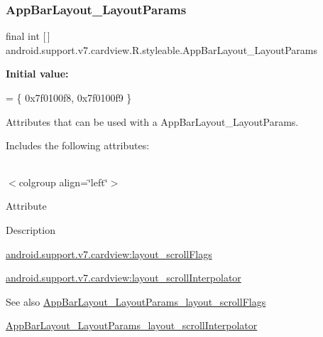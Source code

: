 \subsubsection{\texorpdfstring{App\+Bar\+Layout\+\_\+\+Layout\+Params}{AppBarLayout\_LayoutParams}}
{\footnotesize\ttfamily final int \mbox{[}$\,$\mbox{]} android.\+support.\+v7.\+cardview.\+R.\+styleable.\+App\+Bar\+Layout\+\_\+\+Layout\+Params\hspace{0.3cm}{\ttfamily [static]}}

{\bfseries Initial value\+:}
\begin{DoxyCode}
= \{
            0x7f0100f8, 0x7f0100f9
        \}
\end{DoxyCode}
Attributes that can be used with a App\+Bar\+Layout\+\_\+\+Layout\+Params. 

Includes the following attributes\+:

\tabulinesep=1mm
\begin{longtabu} spread 0pt [c]{*{0}{|X[-1]}|}
\hline
\end{longtabu}
$<$colgroup align=\char`\"{}left\char`\"{}$>$ 

Attribute

Description 

{\ttfamily \hyperlink{classandroid_1_1support_1_1v7_1_1cardview_1_1R_1_1styleable_a53dce7877a5f3d244d65077ff61872fc}{android.\+support.\+v7.\+cardview\+:layout\+\_\+scroll\+Flags}}

{\ttfamily \hyperlink{classandroid_1_1support_1_1v7_1_1cardview_1_1R_1_1styleable_a0de7675ce2c7d78872be858b9691bdb0}{android.\+support.\+v7.\+cardview\+:layout\+\_\+scroll\+Interpolator}}

\begin{DoxySeeAlso}{See also}
\hyperlink{classandroid_1_1support_1_1v7_1_1cardview_1_1R_1_1styleable_a53dce7877a5f3d244d65077ff61872fc}{App\+Bar\+Layout\+\_\+\+Layout\+Params\+\_\+layout\+\_\+scroll\+Flags} 

\hyperlink{classandroid_1_1support_1_1v7_1_1cardview_1_1R_1_1styleable_a0de7675ce2c7d78872be858b9691bdb0}{App\+Bar\+Layout\+\_\+\+Layout\+Params\+\_\+layout\+\_\+scroll\+Interpolator} 
\end{DoxySeeAlso}
\mbox{\label{classandroid_1_1support_1_1v7_1_1cardview_1_1R_1_1styleable_a53dce7877a5f3d244d65077ff61872fc}} 

